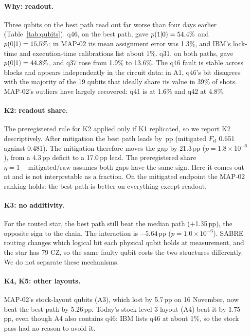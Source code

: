 \documentclass[10pt,twocolumn]{article}
\begin{document}
\paragraph{Why: readout.} Three qubits on the best path read out far worse than four days earlier
(Table~\ref{tab:qubits}). q46, on the best path, gave $p(1|0)=54.4\%$ and $p(0|1)=15.5\%$;
in MAP-02 its mean assignment error was 1.3\%, and IBM's lock-time and execution-time calibrations
list about 1\%. q31, on both paths, gave $p(0|1)=44.8\%$, and q37 rose from 1.9\% to 13.6\%. The q46 fault is stable across blocks
and appears independently in the circuit data: in A1, q46's bit disagrees with the majority of the 19
qubits that ideally share its value in 39\% of shots. MAP-02's outliers have largely recovered:
q41 is at 1.6\% and q42 at 4.8\%.

\paragraph{K2: readout share.} The preregistered rule for K2 applied only if K1 replicated, so we report
K2 descriptively. After mitigation the best path leads by \MitGap\,pp (mitigated $F_{\mathrm{cl}}$ 0.651
against 0.481). The mitigation therefore moves the gap by 21.3\,pp ($p=1.8\times10^{-6}$), from a
4.3\,pp deficit to a 17.0\,pp lead. The preregistered share $\eta=1-\text{mitigated}/\text{raw}$ assumes
both gaps have the same sign. Here it comes out at \EtaEst{} and is not interpretable as a fraction.
On the mitigated endpoint the MAP-02 ranking holds: the best path is better on everything except
readout.

\paragraph{K3: no additivity.} For the routed star, the best path still beat the median path
(+1.35\,pp), the opposite sign to the chain. The interaction is $-5.64$\,pp ($p=1.0\times10^{-6}$).
SABRE routing changes which logical bit each physical qubit holds at measurement, and the star has
79 CZ, so the same faulty qubit costs the two structures differently. We do not separate these
mechanisms.

\paragraph{K4, K5: other layouts.} MAP-02's stock-layout qubits (A3), which lost by 5.7\,pp on 16
November, now beat the best path by 5.26\,pp. Today's stock level-3 layout (A4) beat it by 1.75\,pp,
even though A4 also contains q46: IBM lists q46 at about 1\%, so the stock pass had no reason to avoid
it.
\end{document}
